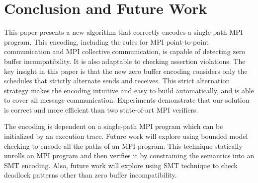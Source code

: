 \section{Conclusion and Future Work}
This paper presents a new algorithm that correctly encodes a single-path MPI program. This encoding, including the rules for MPI point-to-point communication and MPI collective communication, is capable of detecting zero buffer incompatibility. It is also adaptable to checking assertion violations. The key insight in this paper is that the new zero buffer encoding considers only the schedules that strictly alternate sends and receives. This strict alternation strategy makes the encoding intuitive and easy to build automatically, and is able to cover all message communication. Experiments demonstrate that our solution is correct and more efficient than two state-of-art MPI verifiers. 

The encoding is dependent on a single-path MPI program which can be initialized by an execution trace. Future work will explore using bounded model checking to encode all the paths of an MPI program. This technique statically unrolls an MPI program and then verifies it by constraining the semantics into an SMT encoding. Also, future work will explore using SMT technique to check deadlock patterns other than zero buffer incompatibility.  